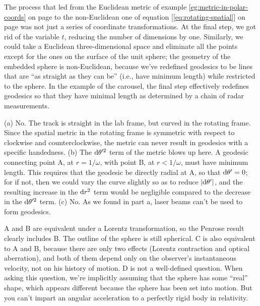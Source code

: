 
The process that led from the Euclidean metric of example \ref{eg:metric-in-polar-coords} on page \pageref{eg:metric-in-polar-coords}
to the non-Euclidean one of equation [\ref{eq:rotating-spatial}] on page \pageref{eq:rotating-spatial} was not just a series
of coordinate transformations. At the final step, we got rid of the variable $t$, reducing the number of dimensions by one.
Similarly, we could take a Euclidean three-dimensional space and eliminate all the points except for the ones on the surface
of the unit sphere; the geometry of the embedded sphere is non-Euclidean, because we've redefined geodesics to be lines that
are ``as straight as they can be'' (i.e., have minimum length) while restricted to the sphere. In the example of the carousel, the final step effectively
redefines geodesics so that they have minimal length as determined by a chain of radar measurements.


(a) No.
The track is straight in the lab frame, but curved in the
rotating frame. Since the spatial metric in the rotating frame is symmetric with respect to clockwise and counterclockwise,
the metric can never result in geodesics with a specific handedness.
(b) The $\textup{d}\theta'^2$ term of the metric blows up here. A geodesic connecting point A, at $r=1/\omega$, with point B, at $r<1/\omega$,
must have minimum length. This requires that the geodesic be directly radial at A, so that $\textup{d}\theta'=0$; for if not, then we could
vary the curve slightly so as to reduce $|\textup{d}\theta'|$, and the resulting increase in the $\textup{d} r^2$ term would be negligible
compared to the decrease in the $\textup{d}\theta'^2$ term. (c) No. As we found in part a, laser beams can't be used to form geodesics.

A and B are equivalent under a Lorentz transformation, so the Penrose result clearly includes B. The outline of the sphere is still spherical.
C is also equivalent to A and B, because there are only two effects (Lorentz contraction and optical aberration), and both of
them depend only on the observer's instantaneous velocity, not on his history of motion.
D is not a well-defined question. When asking this question, we're implicitly assuming that the sphere has some
``real'' shape, which appears different because the sphere has been set into motion. But
you can't impart an angular acceleration to a perfectly rigid body in relativity.

